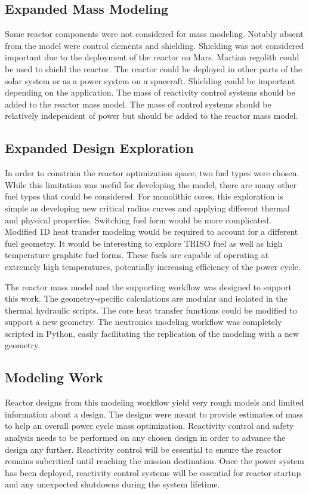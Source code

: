 \subsection{Expanded Mass Modeling}
Some reactor components were not considered for mass modeling. Notably absent
from the model were control elements and shielding. Shielding was not considered
important due to the deployment of the reactor on Mars. Martian regolith could
be used to shield the reactor. The reactor could be deployed in other parts of
the solar system or as a power system on a spaecraft. Shielding could be
important depending on the application. The mass of reactivity control systems
should be added to the reactor mass model. The mass of control systems should 
be relatively independent of power but should be added to the reactor mass
model.

\subsection{Expanded Design Exploration}
In order to constrain the reactor optimization space, two fuel types were
chosen. While this limitation was useful for developing the model, 
there are many other fuel types that could be considered. For monolithic
cores, this exploration is simple as developing new critical radius curves and
applying different thermal and physical properties. Switching fuel form would be
more complicated. Modified 1D heat transfer modeling would be required to
account for a different fuel geometry. It would be interesting to explore
TRISO fuel as well as high temperature graphite fuel forms. These fuels are
capable of operating at extremely high temperatures, potentially increasing
efficiency of the power cycle.

The reactor mass model and the supporting workflow was designed to support this
work. The geometry-specific calculations are modular and isolated in the thermal
hydraulic scripts. The core heat transfer functions could be modified to support
a new geometry. The neutronics modeling workflow was completely scripted in
Python, easily facilitating the replication of the modeling with a new geometry.

\subsection{Modeling Work}
Reactor designs from this modeling workflow yield very rough models and limited
information about a design. The designs were meant to provide estimates of mass
to help an overall power cycle mass optimization. Reactivity control and safety
analysis needs to be performed on any chosen design in order to advance the
design any further. Reactivity control will be essential to ensure the reactor
remains subcritical until reaching the mission destination. Once the power
system has been deployed, reactivity control systems will be essential for
reactor startup and any unexpected shutdowns during the system lifetime.
